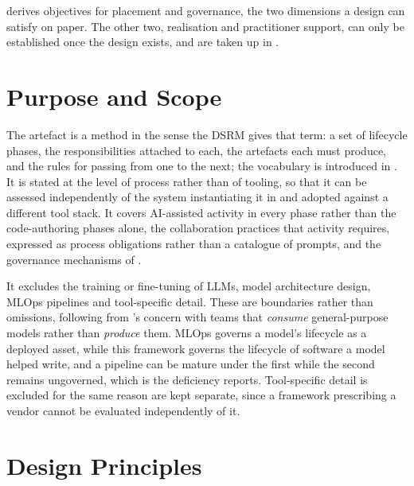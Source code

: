  derives objectives for placement and governance, the two dimensions a design can satisfy on paper. The other two, realisation and practitioner support, can only be established once the design exists, and are taken up in .

\section{Purpose and Scope}
\label{sec:framework_scope}


The artefact is a method in the sense the \ac{DSRM} gives that term: a set of lifecycle phases, the responsibilities attached to each, the artefacts each must produce, and the rules for passing from one to the next; the vocabulary is introduced in . It is stated at the level of process rather than of tooling, so that it can be assessed independently of the system instantiating it in  and adopted against a different tool stack. It covers AI-assisted activity in every phase rather than the code-authoring phases alone, the collaboration practices that activity requires, expressed as process obligations rather than a catalogue of prompts, and the governance mechanisms of .

It excludes the training or fine-tuning of \acp{LLM}, model architecture design, \ac{MLOps} pipelines and tool-specific detail. These are boundaries rather than omissions, following from 's concern with teams that \emph{consume} general-purpose models rather than \emph{produce} them. \ac{MLOps} governs a model's lifecycle as a deployed asset, while this framework governs the lifecycle of software a model helped write, and a pipeline can be mature under the first while the second remains ungoverned, which is the deficiency  reports. Tool-specific detail is excluded for the same reason  are kept separate, since a framework prescribing a vendor cannot be evaluated independently of it.

\section{Design Principles}
\label{sec:design_principles}

